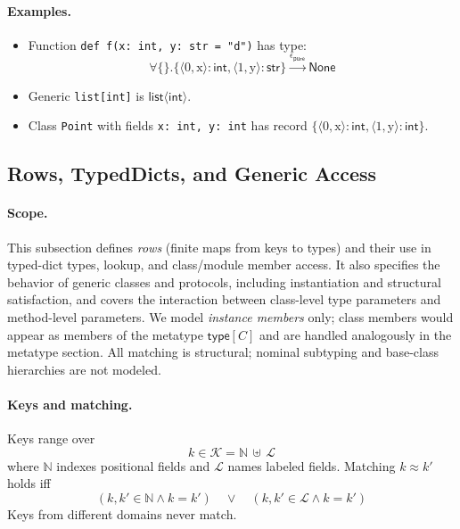 \paragraph{Examples.}  
\begin{itemize}
\item Function \texttt{def f(x: int, y: str = "d")} has type:
 \[\forall \{\}.\{\langle 0, \text{x} \rangle : \mathsf{int}, \langle 1, \text{y} \rangle : \mathsf{str}\} \xrightarrow{\epsilon_\mathsf{pure}} \mathsf{None}\]
\item Generic \texttt{list[int]} is $\mathsf{list}\langle\mathsf{int}\rangle$.
\item Class \texttt{Point} with fields \texttt{x: int, y: int} has record $\{\langle 0, \text{x} \rangle : \mathsf{int}, \langle 1, \text{y} \rangle : \mathsf{int}\}$.
\end{itemize}


\subsection{Rows, TypedDicts, and Generic Access}
\label{sec:rows-generic-access}

\paragraph{Scope.}
This subsection defines \emph{rows} (finite maps from keys to types) and their use in typed-dict types, lookup, and class/module member access.
It also specifies the behavior of generic classes and protocols, including instantiation and structural satisfaction, and covers the interaction between class-level type parameters and method-level parameters.
We model \emph{instance members} only; class members would appear as members of the metatype $\mathsf{type}[C]$ and are handled analogously in the metatype section.
All matching is structural; nominal subtyping and base-class hierarchies are not modeled.

\paragraph{Keys and matching.}
Keys range over
\[
k \in \mathcal{K} = \mathbb{N} \,\uplus\, \mathcal{L}
\]
where $\mathbb{N}$ indexes positional fields and $\mathcal{L}$ names labeled fields.
Matching $k \approx k'$ holds iff
\[
(k, k' \in \mathbb{N} \wedge k = k') \quad\lor\quad (k, k' \in \mathcal{L} \wedge k = k')
\]
Keys from different domains never match.

